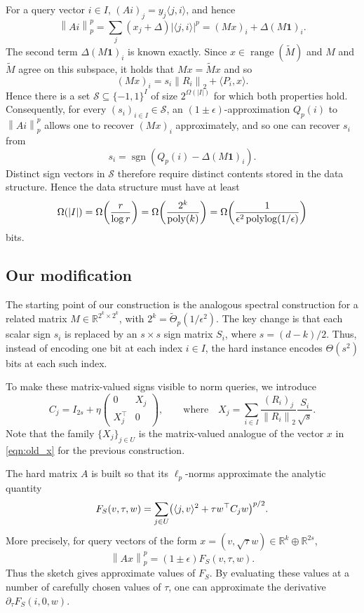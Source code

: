 \documentclass[11pt]{article}
\theoremstyle{remark}
\theoremstyle{definition}
\newcommand{\R}{\mathbb{R}}
\newcommand{\eps}{\epsilon}
\newcommand{\ip}[2]{\langle #1,#2\rangle}
\newcommand{\norm}[1]{\left\|#1\right\|}
\DeclareMathOperator{\poly}{poly}
\DeclareMathOperator{\polylog}{polylog}
\DeclareMathOperator{\range}{range}
\DeclareMathOperator{\sgn}{sgn}
\begin{document}
For a query vector $i \in I$, $(Ai)_j = y_j \ip{j}{i}$, and hence 
\[
	\norm{Ai}_p^p = \sum_j (x_j + \Delta)|\ip{j}{i}|^p = (Mx)_i + \Delta(M\mathbf{1})_i.
\]
The second term $\Delta(M\mathbf{1})_i$ is known exactly. Since $x\in\range(\widetilde{M})$ and $M$ and $\widetilde{M}$ agree on this subspace, it holds that $Mx = \widetilde{M}x$ and so
\begin{equation}\label{eqn:(Mx)_i_old}
	(Mx)_i = s_i \norm{R_i}_2 + \langle P_i, x\rangle.
\end{equation}
Hence there is a set $\mathcal{S}\subseteq\{-1,1\}^{I}$ of size $2^{\Omega(|I|)}$ for which both properties hold. Consequently, for every $(s_i)_{i\in I}\in\mathcal S$, an $(1\pm\eps)$-approximation $Q_p(i)$ to $\norm{Ai}_p^p$ allows one to recover $(Mx)_i$ approximately, and so one can recover $s_i$ from
\[
	s_i = \sgn(Q_p(i) - \Delta(M\mathbf{1})_i).
\]
Distinct sign vectors in $\mathcal{S}$ therefore require distinct contents stored in the data structure. Hence the data structure must have at least
\[
	\Omega(|I|) = \Omega\mleft(\frac{r}{\log r}\mright) = \Omega\mleft(\frac{2^k}{\poly(k)}\mright) = \Omega\mleft(\frac{1}{\eps^2\polylog(1/\eps)}\mright)
\]
bits.

\subsection{Our modification}
The starting point of our construction is the analogous spectral construction for a related matrix $M\in\R^{2^k\times 2^k}$, with $2^k = \widetilde{\Theta}_p(1/\eps^2)$. The key change is that each scalar sign $s_i$ is replaced by an $s\times s$ sign matrix $S_i$, where $s=(d-k)/2$. Thus, instead of encoding one bit at each index $i\in I$, the hard instance encodes $\Theta(s^2)$ bits at each such index.

To make these matrix-valued signs visible to norm queries, we introduce
\[
	C_j
	=
	I_{2s}
	+
	\eta
	\begin{pmatrix}
		0 & X_j\\
		X_j^\top & 0
	\end{pmatrix},
	\qquad\text{where}\quad
	X_j
	=
	\sum_{i\in I}\frac{(R_i)_j}{\norm{R_i}_2}\frac{S_i}{\sqrt{s}}.
\]
Note that the family $\{X_j\}_{j\in U}$ is the matrix-valued analogue of the vector $x$ in \eqref{eqn:old_x} for the previous construction.

The hard matrix $A$ is built so that its $\ell_p$-norms approximate the analytic quantity
\[
	F_S(v,\tau,w)
	=
	\sum_{j\in U}
	\mleft(\ip{j}{v}^2+\tau w^\top C_jw\mright)^{p/2}.
\]
More precisely, for query vectors of the form $x=(v,\sqrt{\tau}w)\in\R^k\oplus \R^{2s}$,
\[
	\norm{Ax}_p^p = (1\pm\eps)F_S(v,\tau,w).
\]
Thus the sketch gives approximate values of $F_S$. By evaluating these values at a number of carefully chosen values of $\tau$, one can approximate the derivative $\partial_\tau F_S(i,0,w)$.
\end{document}
